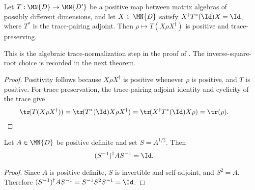 \begin{theorem}
    \label{thm:filtered_trace_normalization_criterion}
    \leanok
    Let $T:\MN{D}\to\MN{D'}$ be a positive map between matrix algebras of
    possibly different dimensions, and let $X\in\MN{D}$ satisfy
    $X^\dagger T^*(\Id)X=\Id$, where $T^*$ is the trace-pairing adjoint.
    Then $\rho\mapsto T(X\rho X^\dagger)$ is positive and trace-preserving.

    This is the algebraic trace-normalization step in the proof of
    \cite[Chapter~3, Lemma ``Making positive maps trace preserving'']
    {Wolf2012Quantum}. The inverse-square-root choice is recorded in the
    next theorem.
\end{theorem}

\begin{proof}\leanok
    Positivity follows because $X\rho X^\dagger$ is positive whenever
    $\rho$ is positive, and $T$ is positive. For trace preservation, the
    trace-pairing adjoint identity and cyclicity of the trace give
    \begin{align}
        \tr\!(T(X\rho X^\dagger))
         & =\tr\!(T^*(\Id)X\rho X^\dagger)
        =\tr\!(X^\dagger T^*(\Id)X\rho)
        =\tr(\rho).
        \notag
    \end{align}
\end{proof}

\begin{lemma}
    \label{lem:conj_inv_sqrt_normalizes}
    \leanok
    \uses{}
    Let $A\in\MN{D}$ be positive definite and set $S=A^{1/2}$. Then
    \begin{align}
        (S^{-1})^\dagger A S^{-1}
         & =\Id.
        \notag
    \end{align}
\end{lemma}

\begin{proof}\leanok
    Since $A$ is positive definite, $S$ is invertible and self-adjoint, and
    $S^2=A$. Therefore
    $(S^{-1})^\dagger A S^{-1}=S^{-1}S^2S^{-1}=\Id$.
\end{proof}

